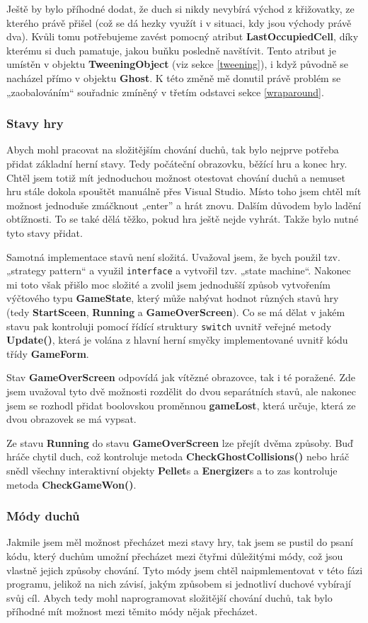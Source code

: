 \documentclass[a4]{article}
\begin{document}
Ještě by bylo příhodné dodat, že duch si nikdy nevybírá východ z křižovatky, ze kterého právě přišel (což se dá hezky využít i v situaci, kdy jsou východy právě dva). Kvůli tomu potřebujeme zavést pomocný atribut \textbf{LastOccupiedCell}, díky kterému si duch pamatuje, jakou buňku posledně navštívit. Tento atribut je umístěn v objektu \textbf{TweeningObject} (viz sekce \ref{tweening}), i když původně se nacházel přímo v objektu \textbf{Ghost}. K této změně mě donutil právě problém se „zaobalováním“ souřadnic zmíněný v třetím odstavci sekce \ref{wraparound}.
\subsubsection{Stavy hry} \label{gamestates}
Abych mohl pracovat na složitějším chování duchů, tak bylo nejprve potřeba přidat základní herní stavy. Tedy počáteční obrazovku, běžící hru a konec hry. Chtěl jsem totiž mít jednoduchou možnost otestovat chování duchů a nemuset hru stále dokola spouštět manuálně přes Visual Studio. Místo toho jsem chtěl mít možnost jednoduše zmáčknout „enter” a hrát znovu. Dalším důvodem bylo ladění obtížnosti. To se také dělá těžko, pokud hra ještě nejde vyhrát. Takže bylo nutné tyto stavy přidat.

Samotná implementace stavů není složitá. Uvažoval jsem, že bych použil tzv. „strategy pattern“ a využil \verb|interface| a vytvořil tzv. „state machine“. Nakonec mi toto však přišlo moc složité a zvolil jsem jednodušší způsob vytvořením výčtového typu \textbf{GameState}, který může nabývat hodnot různých stavů hry (tedy \textbf{StartSceen}, \textbf{Running} a \textbf{GameOverScreen}). Co se má dělat v jakém stavu pak kontroluji pomocí řídící struktury \verb|switch| uvnitř veřejné metody \textbf{Update()}, která je volána z hlavní herní smyčky implementované uvnitř kódu třídy \textbf{GameForm}. 

Stav \textbf{GameOverScreen} odpovídá jak vítězné obrazovce, tak i té poražené. Zde jsem uvažoval tyto dvě možnosti rozdělit do dvou separátních stavů, ale nakonec jsem se rozhodl přidat boolovskou proměnnou \textbf{gameLost}, která určuje, která ze dvou obrazovek se má vypsat.

Ze stavu \textbf{Running} do stavu \textbf{GameOverScreen} lze přejít dvěma způsoby. Buď hráče chytil duch, což kontroluje metoda \textbf{CheckGhostCollisions()} nebo hráč snědl všechny interaktivní objekty \textbf{Pellet}s a \textbf{Energizer}s a to zas kontroluje metoda \textbf{CheckGameWon()}.
\subsubsection{Módy duchů} \label{generalmodes}
Jakmile jsem měl možnost přecházet mezi stavy hry, tak jsem se pustil do psaní kódu, který duchům umožní přecházet mezi čtyřmi důležitými módy, což jsou vlastně jejich způsoby chování. Tyto módy jsem chtěl naipmlementovat v této fázi programu, jelikož na nich závisí, jakým způsobem si jednotliví duchové vybírají svůj cíl. Abych tedy mohl naprogramovat složitější chování duchů, tak bylo příhodné mít možnost mezi těmito módy nějak přecházet.
\end{document}
